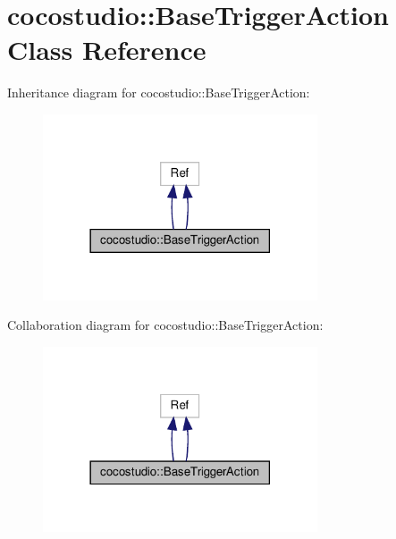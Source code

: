 \hypertarget{classcocostudio_1_1BaseTriggerAction}{}\section{cocostudio\+:\+:Base\+Trigger\+Action Class Reference}
\label{classcocostudio_1_1BaseTriggerAction}


Inheritance diagram for cocostudio\+:\+:Base\+Trigger\+Action\+:
\nopagebreak
\begin{figure}[H]
\begin{center}
\leavevmode
\includegraphics[width=230pt]{classcocostudio_1_1BaseTriggerAction__inherit__graph}
\end{center}
\end{figure}


Collaboration diagram for cocostudio\+:\+:Base\+Trigger\+Action\+:
\nopagebreak
\begin{figure}[H]
\begin{center}
\leavevmode
\includegraphics[width=230pt]{classcocostudio_1_1BaseTriggerAction__coll__graph}
\end{center}
\end{figure}
